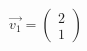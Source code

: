 \documentclass[preview]{standalone}
\begin{document}
\begin{align*}
\vec{v_1} = \begin{pmatrix} 2 \\ 1 \end{pmatrix}
\end{align*}
\end{document}
